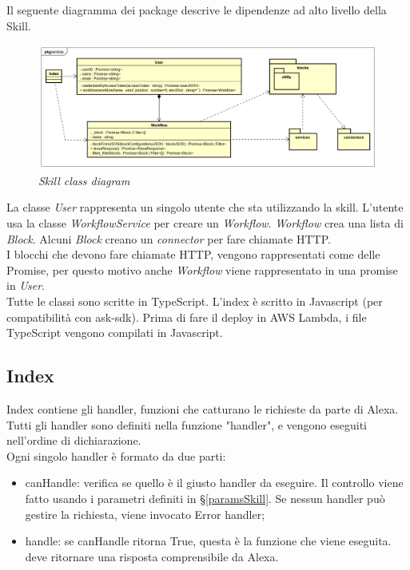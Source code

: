 Il seguente diagramma dei package descrive le dipendenze ad alto livello della Skill.\\
\begin{figure} [H]
    \centering
	\includegraphics[scale=0.35]{./images/ZeroSevenPackageLambda.png}
	\caption{\textit{Skill class diagram}}\label{classlambda}
\end{figure}
\clearpage
La classe \textit{User} rappresenta un singolo utente che sta utilizzando la skill. L'utente usa la classe \textit{WorkflowService} per creare un \textit{Workflow}. \textit{Workflow} crea una lista di \textit{Block}. Alcuni \textit{Block} creano un \textit{connector} per fare chiamate HTTP.\\
I blocchi che devono fare chiamate HTTP, vengono rappresentati come delle Promise, per questo motivo anche \textit{Workflow} viene rappresentato in una promise in \textit{User}.\\
Tutte le classi sono scritte in TypeScript. L'index è scritto in Javascript (per compatibilità con ask-sdk). Prima di fare il deploy in AWS Lambda, i file TypeScript vengono compilati in Javascript.
\subsection{Index}
Index contiene gli handler, funzioni che catturano le richieste da parte di Alexa. Tutti gli handler sono definiti nella funzione "handler", e vengono eseguiti nell'ordine di dichiarazione.\\Ogni singolo handler è formato da due parti:
\begin{itemize}
    \item canHandle: verifica se quello è il giusto handler da eseguire. Il controllo viene fatto usando i parametri definiti in \S\ref{paramsSkill}. Se nessun handler può gestire la richiesta, viene invocato Error handler;
    \item handle: se canHandle ritorna True, questa è la funzione che viene eseguita. deve ritornare una risposta comprensibile da Alexa.
\end{itemize}

